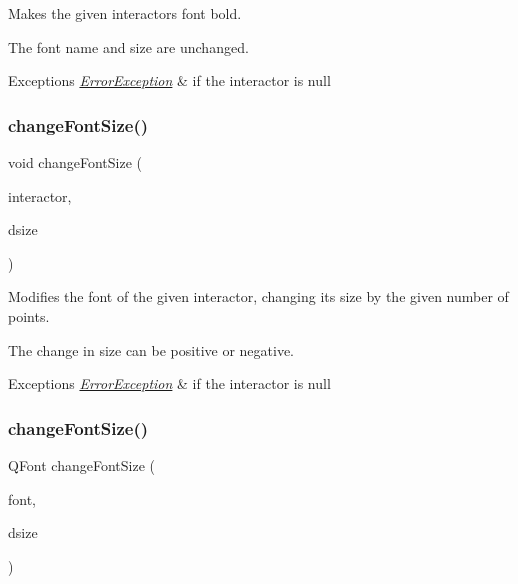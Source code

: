 Makes the given interactor\textquotesingle{}s font bold. 

The font name and size are unchanged. 
\begin{DoxyExceptions}{Exceptions}
{\em \mbox{\hyperlink{classErrorException}{Error\+Exception}}} & if the interactor is null \\
\hline
\end{DoxyExceptions}
\mbox{\label{classGFont_ae6714d087455b3431d6dce6f1202659f}} 
\subsubsection{\texorpdfstring{change\+Font\+Size()}{changeFontSize()}\hspace{0.1cm}{\footnotesize\ttfamily [1/2]}}
{\footnotesize\ttfamily void change\+Font\+Size (\begin{DoxyParamCaption}\item[{\mbox{\hyperlink{classGInteractor}{G\+Interactor}} $\ast$}]{interactor,  }\item[{int}]{dsize }\end{DoxyParamCaption})\hspace{0.3cm}{\ttfamily [static]}}



Modifies the font of the given interactor, changing its size by the given number of points. 

The change in size can be positive or negative. 
\begin{DoxyExceptions}{Exceptions}
{\em \mbox{\hyperlink{classErrorException}{Error\+Exception}}} & if the interactor is null \\
\hline
\end{DoxyExceptions}
\mbox{\label{classGFont_a1f55c64940d99e62528d5bfc634123f8}} 
\subsubsection{\texorpdfstring{change\+Font\+Size()}{changeFontSize()}\hspace{0.1cm}{\footnotesize\ttfamily [2/2]}}
{\footnotesize\ttfamily Q\+Font change\+Font\+Size (\begin{DoxyParamCaption}\item[{const Q\+Font \&}]{font,  }\item[{int}]{dsize }\end{DoxyParamCaption})\hspace{0.3cm}{\ttfamily [static]}}



